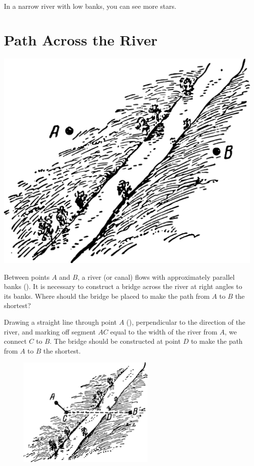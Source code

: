 In a narrow river with low banks, you can see more stars.


\section{Path Across the River}
\label{sec-2.17}


\begin{marginfigure}%
\centering
\includegraphics[width=1.\textwidth]{figures/ch-02/fig-056.pdf}
\end{marginfigure}

\ques Between points $A$ and $B$, a river (or canal) flows with approximately parallel banks (). It is necessary to construct a bridge across the river at right angles to its banks. Where should the bridge be placed to make the path from $A$ to $B$ the shortest?



\ans Drawing a straight line through point $A$ (), perpendicular to the direction of the river, and marking off segment $AC$ equal to the width of the river from $A$, we connect $C$ to $B$. The bridge should be constructed at point $D$ to make the path from $A$ to $B$ the shortest.

\begin{figure}[h!]
\centering
\includegraphics[width=0.6\textwidth]{figures/ch-02/fig-057.pdf}
\end{figure}

